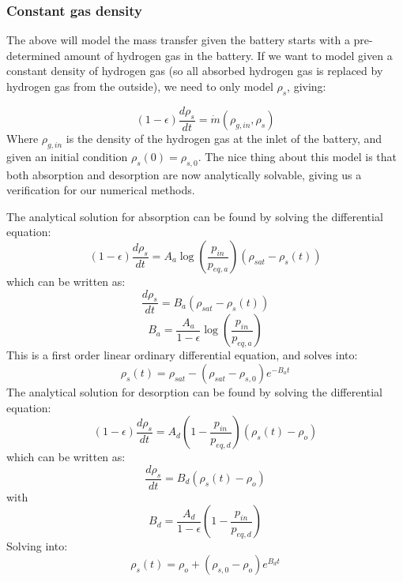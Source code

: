 \subsubsection*{Constant gas density}
The above will model the mass transfer given the battery starts with a pre-determined amount of hydrogen gas in the battery. If we want to model given a constant density of hydrogen gas (so all absorbed hydrogen gas is replaced by hydrogen gas from the outside), we need to only model $\rho_s$, giving:

\begin{equation}
    (1-\epsilon)\frac{d\rho_s}{dt} = \dot{m}(\rho_{g,in}, \rho_s)
\end{equation}
Where $\rho_{g,in}$ is the density of the hydrogen gas at the inlet of the battery, and given an initial condition $\rho_s(0) = \rho_{s,0}$. The nice thing about this model is that both absorption and desorption are now analytically solvable, giving us a verification for our numerical methods. 

The analytical solution for absorption can be found by solving the differential equation:
\begin{equation}
    (1-\epsilon)\frac{d\rho_s}{dt} = A_a \log \left( \frac{p_{in}}{p_{eq,a}} \right)(\rho_{sat} - \rho_s(t))
\end{equation}
which can be written as:
\begin{equation}
    \frac{d\rho_s}{dt} = B_a(\rho_{sat} - \rho_s(t))
\end{equation}
\begin{equation}
    B_a = \frac{A_a}{1-\epsilon} \log \left( \frac{p_{in}}{p_{eq,a}} \right)
    \end{equation}
This is a first order linear ordinary differential equation, and solves into:
\begin{equation}
\rho_s(t) = \rho_{sat} - (\rho_{sat} - \rho_{s,0}) e^{-B_a t}
\end{equation}
The analytical solution for desorption can be found by solving the differential equation:
\begin{equation}
    (1-\epsilon)\frac{d\rho_s}{dt} = A_d \left( 1 - \frac{p_{in}}{p_{eq,d}} \right)( \rho_s(t) - \rho_o)
\end{equation}
which can be written as:
\begin{equation}
    \frac{d\rho_s}{dt} = B_d(\rho_s(t) - \rho_o)
\end{equation}
with
\begin{equation}
    B_d = \frac{A_d}{1-\epsilon} \left( 1 - \frac{p_{in}}{p_{eq,d}} \right)
\end{equation}
Solving into:
\begin{equation}
\rho_s(t) = \rho_o + (\rho_{s,0} - \rho_o) e^{B_d t}
\end{equation}

